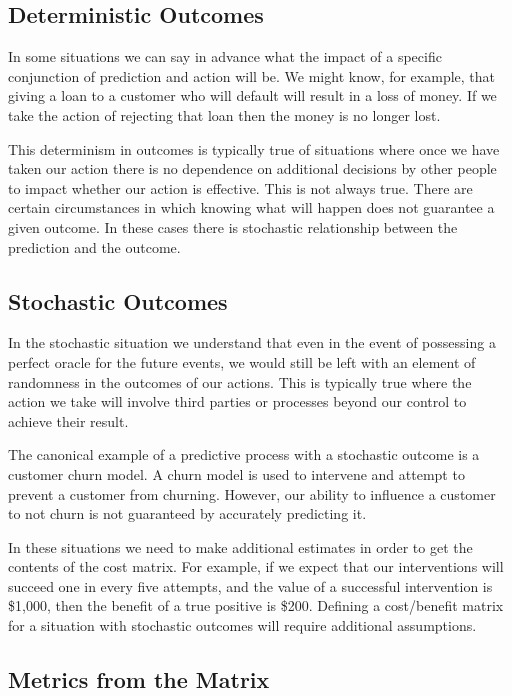 \documentclass[12pt,a4paper]{article}
\numberwithin{equation}{section}
\begin{document}
\subsection{Deterministic Outcomes}

In some situations we can say in advance what the impact of a specific conjunction of prediction
and action will be. We might know, for example, that giving a loan to a customer who will default will result
in a loss of money. If we take the action of rejecting that loan then the money is no longer lost.

This determinism in outcomes is typically true of situations where once we have taken our action there is no dependence
on additional decisions by other people to impact whether our action is effective.
This is not always true. There are certain circumstances in which knowing what will happen does
not guarantee a given outcome. In these cases there is stochastic relationship between the prediction and the outcome.


\subsection{Stochastic Outcomes}

In the stochastic situation we understand that even in the event of possessing a perfect oracle for the future events,
we would still be left with an element of randomness in the outcomes of our actions. This is typically true where the action we take
will involve third parties or processes beyond our control to achieve their result. 

The canonical example of a predictive process with a stochastic outcome is a customer churn model. 
A churn model is used to intervene and attempt to prevent a customer from churning.
However, our ability to influence a customer to not churn is not guaranteed by accurately predicting it. 

In these situations we need to make additional estimates in order to get the contents of the cost matrix. For example,
if we expect that our interventions will succeed one in every five attempts, and the value of a successful intervention
is \$1,000, then the benefit of a true positive is \$200. 
Defining a cost/benefit matrix for a situation with stochastic outcomes will
require additional assumptions.

\subsection{Metrics from the Matrix}
\end{document}
